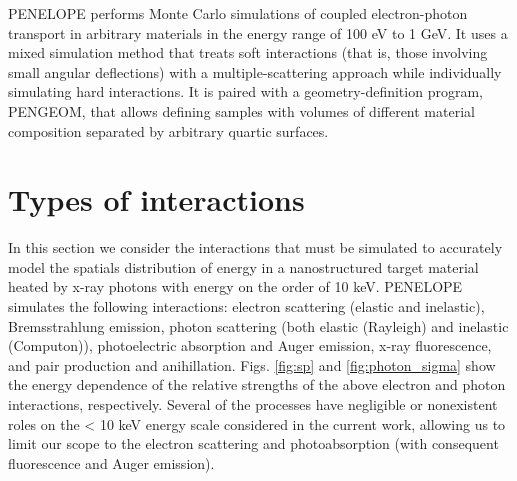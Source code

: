 \documentclass [11pt, proquest, article] {uwthesis}[2016/11/22]
\begin{document}
\label{Penelope} %




PENELOPE performs Monte Carlo simulations of coupled electron-photon transport in arbitrary materials in the energy range of 100 eV to 1 GeV. It uses a mixed simulation method that treats soft interactions (that is, those involving small angular deflections) with a multiple-scattering approach while individually simulating hard interactions. It is paired with a geometry-definition program, PENGEOM, that allows defining samples with volumes of different material composition separated by arbitrary quartic surfaces.

\section{Types of interactions}
In this section we consider the interactions that must be simulated to accurately model the spatials distribution of energy in a nanostructured target material heated by x-ray photons with energy on the order of 10 keV.
PENELOPE simulates the following interactions: electron scattering (elastic and inelastic), Bremsstrahlung emission, photon scattering (both elastic (Rayleigh) and inelastic (Computon)), photoelectric absorption and Auger emission, x-ray fluorescence, and pair production and anihillation. 
Figs. \ref{fig:sp} and \ref{fig:photon_sigma} show the energy dependence of the relative strengths of the above electron and photon interactions, respectively. 
Several of the processes have negligible or nonexistent roles on the < 10 keV energy scale considered in the current work, allowing us to limit our scope to the electron scattering and photoabsorption (with consequent fluorescence and Auger emission).
\end{document}
